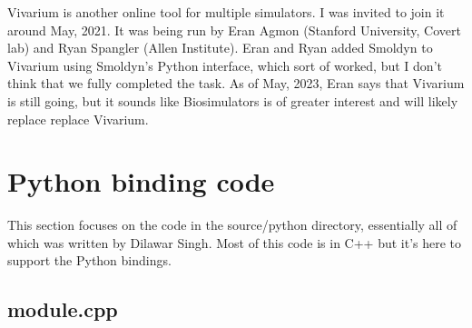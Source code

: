 \documentclass {scrbook}
\begin{document}
Vivarium is another online tool for multiple simulators. I was invited to join it around May, 2021. It was being run by Eran Agmon (Stanford University, Covert lab) and Ryan Spangler (Allen Institute). Eran and Ryan added Smoldyn to Vivarium using Smoldyn's Python interface, which sort of worked, but I don't think that we fully completed the task. As of May, 2023, Eran says that Vivarium is still going, but it sounds like Biosimulators is of greater interest and will likely replace replace Vivarium.


\chapter{Python binding code}

This section focuses on the code in the source/python directory, essentially all of which was written by Dilawar Singh. Most of this code is in C++ but it's here to support the Python bindings.

\section{module.cpp}
\end{document}
